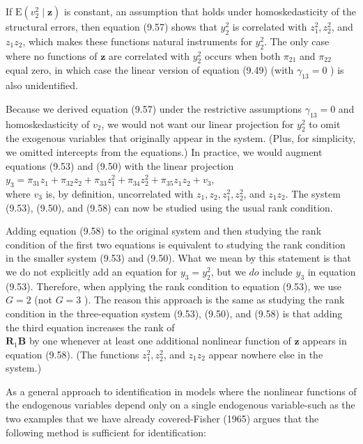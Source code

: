 \documentclass[10pt]{article}
\begin{document}
If $\mathrm{E}\left(v_{2}^{2} \mid \mathbf{z}\right)$ is constant, an assumption that holds under homoskedasticity of the structural errors, then equation (9.57) shows that $y_{2}^{2}$ is correlated with $z_{1}^{2}, z_{2}^{2}$, and $z_{1} z_{2}$, which makes these functions natural instruments for $y_{2}^{2}$. The only case where no functions of $\mathbf{z}$ are correlated with $y_{2}^{2}$ occurs when both $\pi_{21}$ and $\pi_{22}$ equal zero, in which case the linear version of equation (9.49) (with $\gamma_{13}=0$ ) is also unidentified.

Because we derived equation (9.57) under the restrictive assumptions $\gamma_{13}=0$ and homoskedasticity of $v_{2}$, we would not want our linear projection for $y_{2}^{2}$ to omit the exogenous variables that originally appear in the system. (Plus, for simplicity, we omitted intercepts from the equations.) In practice, we would augment equations (9.53) and (9.50) with the linear projection\\
$y_{3}=\pi_{31} z_{1}+\pi_{32} z_{2}+\pi_{33} z_{1}^{2}+\pi_{34} z_{2}^{2}+\pi_{35} z_{1} z_{2}+v_{3}$,\\
where $v_{3}$ is, by definition, uncorrelated with $z_{1}, z_{2}, z_{1}^{2}, z_{2}^{2}$, and $z_{1} z_{2}$. The system (9.53), (9.50), and (9.58) can now be studied using the usual rank condition.

Adding equation (9.58) to the original system and then studying the rank condition of the first two equations is equivalent to studying the rank condition in the smaller system (9.53) and (9.50). What we mean by this statement is that we do not explicitly add an equation for $y_{3}=y_{2}^{2}$, but we $d o$ include $y_{3}$ in equation (9.53). Therefore, when applying the rank condition to equation (9.53), we use $G=2$ (not $G=3$ ). The reason this approach is the same as studying the rank condition in the three-equation system (9.53), (9.50), and (9.58) is that adding the third equation increases the rank of\\
$\mathbf{R}_{1} \mathbf{B}$ by one whenever at least one additional nonlinear function of $\mathbf{z}$ appears in equation (9.58). (The functions $z_{1}^{2}, z_{2}^{2}$, and $z_{1} z_{2}$ appear nowhere else in the system.)

As a general approach to identification in models where the nonlinear functions of the endogenous variables depend only on a single endogenous variable-such as the two examples that we have already covered-Fisher (1965) argues that the following method is sufficient for identification:
\end{document}
